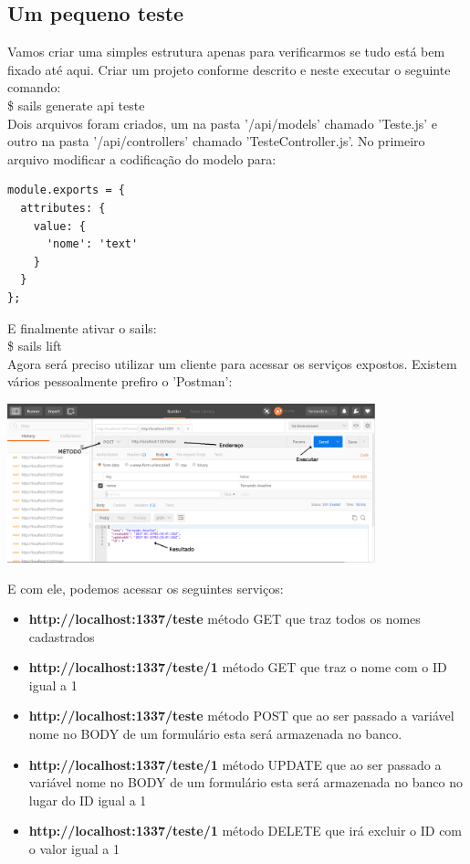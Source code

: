\documentclass[a4paper,11pt]{article}
\begin{document}
\subsection{Um pequeno teste}
Vamos criar uma simples estrutura apenas para verificarmos se tudo está bem fixado até aqui. Criar um projeto conforme descrito e neste executar o seguinte comando: \\[1mm]
{\ttfamily\$ sails generate api teste} \\[3mm]
Dois arquivos foram criados, um na pasta '/api/models' chamado 'Teste.js' e outro na pasta '/api/controllers' chamado 'TesteController.js'. No primeiro arquivo modificar a codificação 
do modelo para:
\begin{lstlisting}
module.exports = {
  attributes: {
    value: {
      'nome': 'text'
    }
  }
};
\end{lstlisting}
E finalmente ativar o sails: \\[1mm]
{\ttfamily\$ sails lift} \\[3mm]
Agora será preciso utilizar um cliente para acessar os serviços expostos. Existem vários pessoalmente prefiro o 'Postman':
\begin{center} 
\includegraphics[width=0.8\textwidth]{Postman.png} 
\end{center}
E com ele, podemos acessar os seguintes serviços:
\begin{itemize}
  \item \textbf{http://localhost:1337/teste} método GET que traz todos os nomes cadastrados
  \item \textbf{http://localhost:1337/teste/1} método GET que traz o nome com o ID igual a 1
  \item \textbf{http://localhost:1337/teste} método POST que ao ser passado a variável nome no BODY de um formulário esta será armazenada no banco.
  \item \textbf{http://localhost:1337/teste/1} método UPDATE que ao ser passado a variável nome no BODY de um formulário esta será armazenada no banco no lugar do ID igual a 1 
  \item \textbf{http://localhost:1337/teste/1} método DELETE que irá excluir o ID com o valor igual a 1
\end{itemize}
\end{document}

